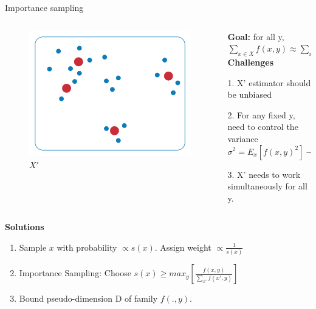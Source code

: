 \documentclass[
  ignorenonframetext,
]{beamer}
\providecommand{\tightlist}{%
  \setlength{\itemsep}{0pt}\setlength{\parskip}{0pt}}
\begin{document}
\begin{frame}{Importance sampling}
\protect\hypertarget{importance-sampling}{}
\begin{columns}[T]
\begin{column}{.2\textwidth}
\begin{figure}
\centering
\includegraphics[width=1\textwidth]{data-core-set.png}
\caption{$X'$}
\end{figure}
\end{column}
\begin{column}{.8\textwidth}
\begin{small}
\textbf{Goal:} for all y,  $\sum_{x \in X} f(x, y) \approx \sum_{x \in X'} w(x) f(x, y)$
\pause
\textbf{Challenges}

1. X' estimator should be unbiased

2. For any fixed y, need to control the variance $$\sigma^2 = E_x [f(x, y)^2] - E_x[f(x, y)]^2$$

3. X' needs to work simultaneously for all y.

\end{small}
\end{column}
\end{columns}
\pause

\textbf{Solutions}

\begin{enumerate}
\tightlist
\item
  Sample \(x\) with probability \(\propto s(x)\). Assign weight
  \(\propto \frac{1}{s(x)}\)
\item
  Importance Sampling: Choose
  \(s(x) \geq max_{y} [\frac{f(x, y)}{\sum_{x'} f(x', y)}]\)
\item
  Bound pseudo-dimension D of family \(f(., y)\).
\end{enumerate}
\end{frame}
\end{document}
